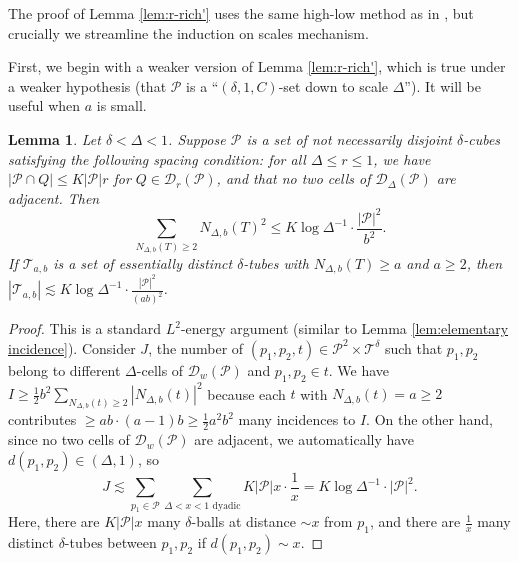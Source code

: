 \documentclass{amsart}
\newtheorem{lemma}[prop]{Lemma}
\newcommand{\T}{\mathcal{T}}
\newcommand{\lesim}{\lesssim}
\newcommand{\cD}{\mathcal{D}}
\newcommand{\cP}{\mathcal{P}}
\begin{document}
The proof of Lemma \ref{lem:r-rich'} uses the same high-low method as in \cite{guth2019incidence}, but crucially we streamline the induction on scales mechanism.

First, we begin with a weaker version of Lemma \ref{lem:r-rich'}, which is true under a weaker hypothesis (that $\cP$ is a ``$(\delta, 1, C)$-set down to scale $\Delta$''). It will be useful when $a$ is small.
\begin{lemma}\label{lem:r-rich weaker}
    Let $\delta < \Delta < 1$. Suppose $\cP$ is a set of not necessarily disjoint $\delta$-cubes satisfying the following spacing condition: for all $\Delta \le r \le 1$, we have $|\cP \cap Q| \le K |\cP| r$ for $Q \in \cD_r (\cP)$, and that no two cells of $\cD_\Delta (\cP)$ are adjacent. Then
    \begin{equation*}
        \sum_{N_{\Delta,b} (T) \ge 2} N_{\Delta,b} (T)^2 \le K \log \Delta^{-1} \cdot \frac{|\cP|^2}{b^2}.
    \end{equation*}
    If $\T_{a,b}$ is a set of essentially distinct $\delta$-tubes with $N_{\Delta,b} (T) \ge a$ and $a \ge 2$, then $|\T_{a,b}| \lesim K \log \Delta^{-1} \cdot \frac{|\cP|^2}{(ab)^2}$.
\end{lemma}

\begin{proof}
    This is a standard $L^2$-energy argument (similar to Lemma \ref{lem:elementary incidence}). Consider $J$, the number of $(p_1, p_2, t) \in \cP^2 \times \T^\delta$ such that $p_1, p_2$ belong to different $\Delta$-cells of $\cD_w (\cP)$ and $p_1, p_2 \in t$. We have $I \ge \frac{1}{2} b^2 \sum_{N_{\Delta,b} (t) \ge 2} |N_{\Delta,b} (t)|^2$ because each $t$ with $N_{\Delta,b} (t) = a \ge 2$ contributes $\ge ab \cdot (a-1)b \ge \frac{1}{2} a^2 b^2$ many incidences to $I$. On the other hand, since no two cells of $\cD_w (\cP)$ are adjacent, we automatically have $d(p_1, p_2) \in (\Delta, 1)$, so
    \begin{equation*}
        J \lesim \sum_{p_1 \in \cP} \sum_{\Delta < x < 1 \text{ dyadic}} K|\cP| x \cdot \frac{1}{x} = K \log \Delta^{-1} \cdot |\cP|^2.
    \end{equation*}
    Here, there are $K |\cP| x$ many $\delta$-balls at distance $\sim x$ from $p_1$, and there are $\frac{1}{x}$ many distinct $\delta$-tubes between $p_1, p_2$ if $d(p_1, p_2) \sim x$.
\end{proof}
\end{document}
